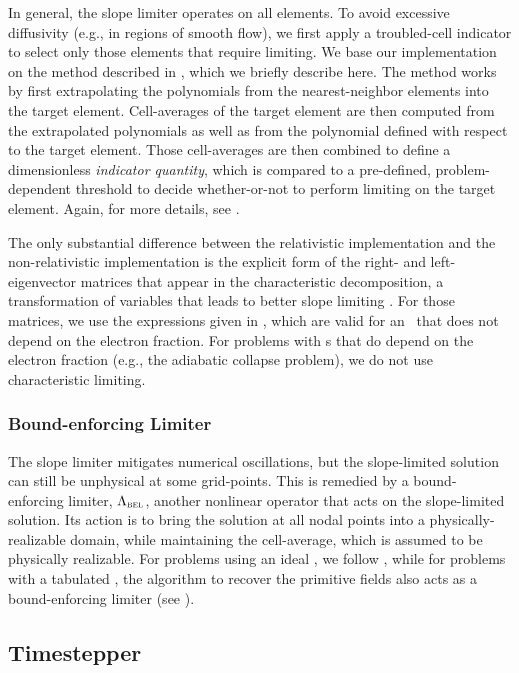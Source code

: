 In general, the slope limiter operates on all elements.
To avoid excessive diffusivity (e.g., in regions of smooth flow),
we first apply a troubled-cell indicator to select only
those elements that require limiting.
We base our implementation on the method described in \citet{fs2017},
which we briefly describe here.
The method works by first extrapolating the polynomials from the
nearest-neighbor elements into the target element.
Cell-averages of the target element are then computed from the
extrapolated polynomials as well as from the polynomial defined
with respect to the target element.
Those cell-averages are then combined to define a dimensionless
\emph{indicator quantity}, which is compared to a pre-defined,
problem-dependent threshold to decide whether-or-not to perform limiting on
the target element.
Again, for more details, see \citet{pbe2021}.

The only substantial difference between the relativistic implementation
and the non-relativistic implementation is the
explicit form of the right- and left-eigenvector matrices that appear in the
characteristic decomposition, a transformation of variables that leads to
better slope limiting \citep{cs1998}.
For those matrices, we use the expressions given in \citet{rz2013}, which are
valid for an \eos\ that does not depend on the electron fraction.
For problems with \eos s that do depend on the electron fraction
(e.g., the adiabatic collapse problem),
we do not use characteristic limiting.

\subsubsection{Bound-enforcing Limiter}

The slope limiter mitigates numerical oscillations, but the slope-limited
solution can still be unphysical at some grid-points.
This is remedied by a bound-enforcing limiter, $\Lambda_{\textsc{bel}}$,
another nonlinear operator that acts on the slope-limited solution.
Its action is to bring the solution at all nodal
points into a physically-realizable domain, while
maintaining the cell-average, which is assumed to be physically realizable.
For problems using an ideal \eos, we follow \citet{qsy2016},
while for problems with a tabulated \eos, the algorithm to recover the
primitive fields also acts as a bound-enforcing limiter
(see ).

\subsection{Timestepper}

